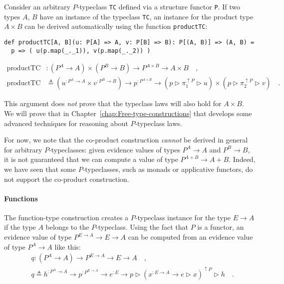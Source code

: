 Consider an arbitrary $P$-typeclass \lstinline!TC! defined via a
structure functor \lstinline!P!. If two types $A$, $B$ have an
instance of the typeclass \lstinline!TC!, an instance for the product
type $A\times B$ can be derived automatically using the function
\lstinline!productTC!:
\begin{lstlisting}
def productTC[A, B](u: P[A] => A, v: P[B] => B): P[(A, B)] => (A, B) =
  p => ( u(p.map(_._1)), v(p.map(_._2)) )
\end{lstlisting}
\begin{align*}
\text{productTC} & :(P^{A}\rightarrow A)\times(P^{B}\rightarrow B)\rightarrow P^{A\times B}\rightarrow A\times B\quad,\\
\text{productTC} & \triangleq(u^{:P^{A}\rightarrow A}\times v^{:P^{B}\rightarrow B})\rightarrow p^{:P^{A\times B}}\rightarrow(p\triangleright\pi_{1}^{\uparrow P}\triangleright u)\times(p\triangleright\pi_{2}^{\uparrow P}\triangleright v)\quad.
\end{align*}

This argument does \emph{not} prove that the typeclass laws will also
hold for $A\times B$. We will prove that in Chapter~\ref{chap:Free-type-constructions}
that develops some advanced techniques for reasoning about $P$-typeclass
laws.

For now, we note that the co-product construction \emph{cannot} be
derived in general for arbitrary $P$-typeclasses: given evidence
values of types $P^{A}\rightarrow A$ and $P^{B}\rightarrow B$, it
is not guaranteed that we can compute a value of type $P^{A+B}\rightarrow A+B$.
Indeed, we have seen that some $P$-typeclasses, such as monads or
applicative functors, do not support the co-product construction.

\paragraph{Functions}

The function-type construction creates a $P$-typeclass instance for
the type $E\rightarrow A$ if the type $A$ belongs to the $P$-typeclass.
Using the fact that $P$ is a functor, an evidence value of type $P^{E\rightarrow A}\rightarrow E\rightarrow A$
can be computed from an evidence value of type $P^{A}\rightarrow A$
like this:
\begin{align*}
 & q:(P^{A}\rightarrow A)\rightarrow P^{E\rightarrow A}\rightarrow E\rightarrow A\quad,\\
 & q\triangleq h^{:P^{A}\rightarrow A}\rightarrow p^{:P^{E\rightarrow A}}\rightarrow e^{:E}\rightarrow p\triangleright(x^{:E\rightarrow A}\rightarrow e\triangleright x)^{\uparrow P}\triangleright h\quad.
\end{align*}

